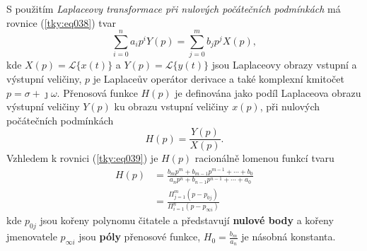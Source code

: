       S použitím \emph{Laplaceovy transformace při nulových počátečních podmínkách} má rovnice
      (\ref{tky:eq038}) tvar
      \begin{equation}\label{tky:eq039}
        \sum_{i=0}^na_ip^iY(p)=\sum_{j=0}^mb_jp^jX(p),
      \end{equation}
      kde $X(p)=\mathcal{L}\{x(t)\}$ a $Y(p)=\mathcal{L}\{y(t)\}$ jsou Laplaceovy obrazy vstupní a
      výstupní veličiny, $p$ je Laplaceův operátor derivace a také komplexní kmitočet
      $p=\sigma+\jmath\omega$. Přenosová funkce $H(p)$ je definována jako podíl Laplaceova obrazu
      výstupní veličiny $Y(p)$ ku obrazu vstupní veličiny $x(p)$, při nulových počátečních
      podmínkách
      \begin{equation}\label{tky:eq040}
          H(p)=\frac{Y(p)}{X(p)}.
      \end{equation}
      Vzhledem k rovnici (\ref{tky:eq039}) je $H(p)$ racionálně lomenou funkcí tvaru
      \begin{align}
        H(p)&=\frac{b_mp^m+b_{m-1}p^{m-1}+\cdots+b_0}{a_np^n+b_{n-1}p^{n-1}+\cdots+a_0}  \nonumber\\
            &=\frac{\Pi_{j=1}^m(p-p_{0j})}{\Pi_{i=1}^n(p-p_{\infty i})}            \label{tky:eq002}
      \end{align}
      kde $p_{0j}$ jsou kořeny polynomu čitatele a představují \textbf{nulové body} a kořeny
      jmenovatele $p_{\infty i}$ jsou \textbf{póly} přenosové funkce, $H_0=\frac{b_m}{a_n}$ je
      násobná konstanta.
  
